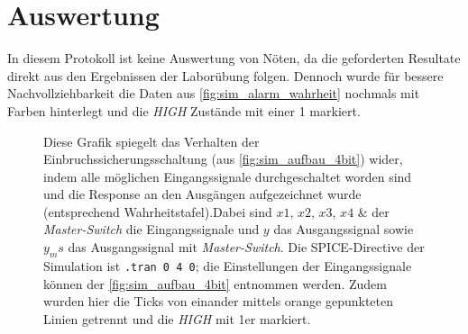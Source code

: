 \documentclass[12pt,english,ngerman]{scrartcl}
\begin{document}

\section{Auswertung}\label{sec:Auswertung}
In diesem Protokoll ist keine Auswertung von Nöten, da die geforderten Resultate
direkt aus den Ergebnissen der Laborübung folgen. Dennoch wurde für bessere 
Nachvollziehbarkeit die Daten aus \autoref{fig:sim_alarm_wahrheit} nochmals mit Farben
hinterlegt und die \textit{HIGH} Zustände mit einer 1 markiert. 

\begin{figure}[H]
  \centering
  \caption{Diese Grafik spiegelt das Verhalten der
    Einbruchssicherungsschaltung (aus \autoref{fig:sim_aufbau_4bit}) wider, indem alle
    möglichen Eingangssignale durchgeschaltet worden sind und die Response an den
    Ausgängen aufgezeichnet wurde (entsprechend Wahrheitstafel).Dabei sind $x1$, $x2$, $x3$, $x4$ \&
    der \textit{Master-Switch} die Eingangssignale und $y$ das Ausgangssignal sowie $y_ms$
    das Ausgangssignal mit \textit{Master-Switch}. Die
    SPICE-Directive der Simulation ist \texttt{.tran 0 4 0}; die
    Einstellungen der Eingangssignale können der \autoref{fig:sim_aufbau_4bit}
  entnommen werden. Zudem wurden hier die Ticks von einander mittels orange gepunkteten Linien getrennt und die \textit{HIGH} mit 1er markiert.}
  \label{fig:sim_alarm_wahrheit_aus}
\end{figure}
\end{document}
